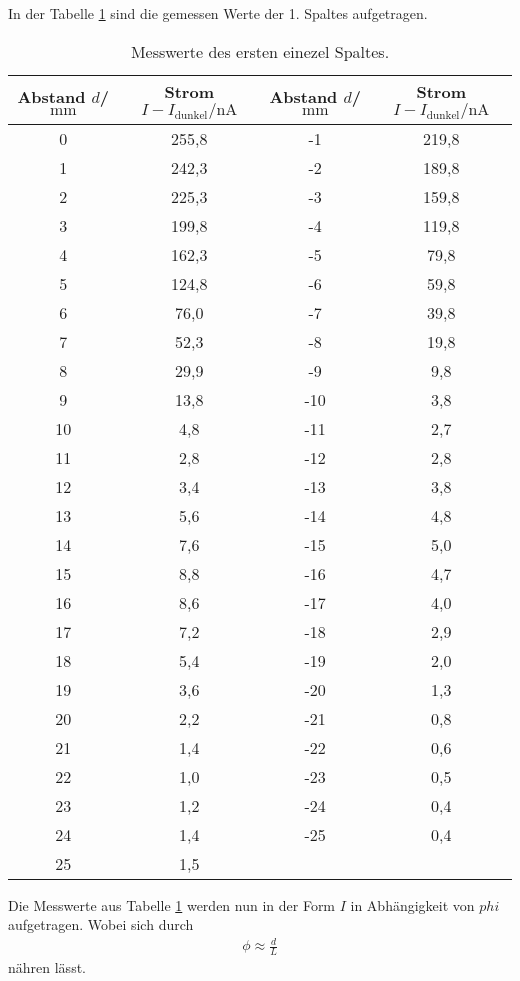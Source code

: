 In der Tabelle \ref{tab:spalt1} sind die gemessen Werte
der 1. Spaltes aufgetragen.
\begin{table}
  \centering
  \caption{Messwerte des ersten einezel Spaltes.}
  \label{tab:spalt1}
  \begin{tabular}{c c c c}
Abstand $d$/$\si{\milli\meter}$ & Strom $I-I_\mathrm{dunkel}/\si{\nano\ampere}$ & Abstand $d$/$\si{\milli\meter}$ & Strom $I-I_\mathrm{dunkel}/\si{\nano\ampere}$\\
    \midrule
     0 & 255,8 & -1   & 219,8\\
     1 & 242,3 & -2   & 189,8\\
     2 & 225,3 & -3   & 159,8\\
     3 & 199,8 & -4   & 119,8\\
     4 & 162,3 & -5   & 79,8 \\
     5 & 124,8 & -6   & 59,8 \\
     6 & 76,0  & -7   & 39,8 \\
     7 & 52,3  & -8   & 19,8 \\
     8 & 29,9  & -9   & 9,8  \\
     9 & 13,8  & -10  & 3,8  \\
    10 & 4,8   & -11  & 2,7  \\
    11 & 2,8   & -12  & 2,8  \\
    12 & 3,4   & -13  & 3,8  \\
    13 & 5,6   & -14  & 4,8  \\
    14 & 7,6   & -15  & 5,0  \\
    15 & 8,8   & -16  & 4,7  \\
    16 & 8,6   & -17  & 4,0  \\
    17 & 7,2   & -18  & 2,9  \\
    18 & 5,4   & -19  & 2,0  \\
    19 & 3,6   & -20  & 1,3  \\
    20 & 2,2   & -21  & 0,8  \\
    21 & 1,4   & -22  & 0,6  \\
    22 & 1,0   & -23  & 0,5  \\
    23 & 1,2   & -24  & 0,4  \\
    24 & 1,4   & -25  & 0,4  \\
    25 & 1,5   & &           \\
    \bottomrule
    \end{tabular}
\end{table}

Die Messwerte aus Tabelle \ref{tab:spalt1} werden nun
in der Form $I$ in Abhängigkeit von $phi$
aufgetragen.
Wobei \phi sich durch
\begin{align*}
  \phi\approx\frac{d}{L}
\end{align*}
nähren lässt.

